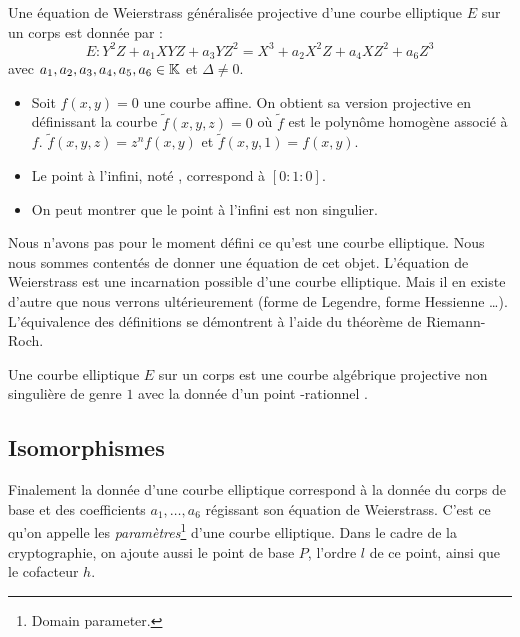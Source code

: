 \begin{definition}
Une équation de Weierstrass généralisée projective d'une courbe elliptique $E$ sur un corps \field{} est donnée par :
\begin{equation}
E : Y^2Z + a_1XYZ + a_3YZ^2 = X^3 + a_2X^2Z + a_4XZ^2 + a_6Z^3
\end{equation}
avec $a_1, a_2, a_3, a_4, a_5, a_6  \in \mathbb{K}{}$ et $\Delta \neq 0$.
\end{definition}

\begin{itemize}[label = --]
    \item Soit $f(x,y) = 0$ une courbe affine. On obtient sa version projective en définissant la courbe $\tilde{f}(x,y,z) = 0$ où $\tilde{f}$ est le polynôme homogène associé à $f$. $\tilde{f}(x,y,z) = z^n f(x,y)$ et $\tilde{f}(x,y,1) = f(x,y)$.
    \item Le point à l'infini, noté \infini{}, correspond à $[0 : 1 : 0]$.
    \item On peut montrer que le point à l'infini est non singulier.
\end{itemize}

\vspace{0.3cm}

Nous n'avons pas pour le moment défini ce qu'est une courbe elliptique. Nous nous sommes contentés de donner une équation de cet objet. L'équation de Weierstrass est une incarnation possible d'une courbe elliptique. Mais il en existe d'autre que nous verrons ultérieurement (forme de Legendre, forme Hessienne \ldots ). L'équivalence des définitions se démontrent à l'aide du théorème de Riemann-Roch.

\begin{definition}
Une courbe elliptique $E$ sur un corps \field{} est une courbe algébrique projective non singulière de genre $1$ avec la donnée d'un point \field{}-rationnel \infini{}.
\end{definition}

\subsection{Isomorphismes}
Finalement la donnée d'une courbe elliptique correspond à la donnée du corps de base \field{} et des coefficients $a_1, \ldots, a_6$ régissant son équation de Weierstrass. C'est ce qu'on appelle les \emph{paramètres}\footnote{Domain parameter.} d'une courbe elliptique. Dans le cadre de la cryptographie, on ajoute aussi le point de base $P$, l'ordre $l$ de ce point, ainsi que le cofacteur $h$. 

